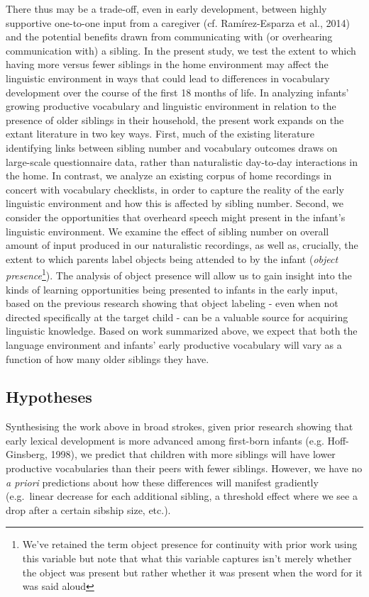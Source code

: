 \documentclass[
  man,mask,floatsintext]{apa6}
\begin{document}
There thus may be a trade-off, even in early development, between highly supportive one-to-one input from a caregiver (cf. Ramírez-Esparza et al., 2014) and the potential benefits drawn from communicating with (or overhearing communication with) a sibling. In the present study, we test the extent to which having more versus fewer siblings in the home environment may affect the linguistic environment in ways that could lead to differences in vocabulary development over the course of the first 18 months of life. In analyzing infants' growing productive vocabulary and linguistic environment in relation to the presence of older siblings in their household, the present work expands on the extant literature in two key ways. First, much of the existing literature identifying links between sibling number and vocabulary outcomes draws on large-scale questionnaire data, rather than naturalistic day-to-day interactions in the home. In contrast, we analyze an existing corpus of home recordings in concert with vocabulary checklists, in order to capture the reality of the early linguistic environment and how this is affected by sibling number. Second, we consider the opportunities that overheard speech might present in the infant's linguistic environment. We examine the effect of sibling number on overall amount of input produced in our naturalistic recordings, as well as, crucially, the extent to which parents label objects being attended to by the infant (\emph{object presence}\footnote{We’ve retained the term object presence for continuity with prior work using this variable but note that what this variable captures isn’t merely whether the object was present but rather whether it was present when the word for it was said aloud}). The analysis of object presence will allow us to gain insight into the kinds of learning opportunities being presented to infants in the early input, based on the previous research showing that object labeling - even when not directed specifically at the target child - can be a valuable source for acquiring linguistic knowledge. Based on work summarized above, we expect that both the language environment and infants' early productive vocabulary will vary as a function of how many older siblings they have.

\hypertarget{hypotheses}{%
\subsection{Hypotheses}\label{hypotheses}}

Synthesising the work above in broad strokes, given prior research showing that early lexical development is more advanced among first-born infants (e.g. Hoff-Ginsberg, 1998), we predict that children with more siblings will have lower productive vocabularies than their peers with fewer siblings. However, we have no \emph{a priori} predictions about how these differences will manifest gradiently (e.g.~linear decrease for each additional sibling, a threshold effect where we see a drop after a certain sibship size, etc.).
\end{document}
